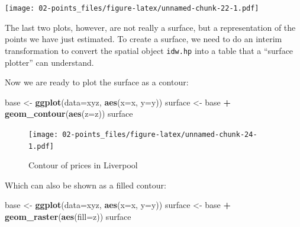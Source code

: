 \documentclass[]{book}
\newenvironment{Shaded}{\begin{snugshade}}{\end{snugshade}}
\newcommand{\KeywordTok}[1]{\textcolor[rgb]{0.13,0.29,0.53}{\textbf{#1}}}
\newcommand{\DataTypeTok}[1]{\textcolor[rgb]{0.13,0.29,0.53}{#1}}
\newcommand{\DecValTok}[1]{\textcolor[rgb]{0.00,0.00,0.81}{#1}}
\newcommand{\StringTok}[1]{\textcolor[rgb]{0.31,0.60,0.02}{#1}}
\newcommand{\OperatorTok}[1]{\textcolor[rgb]{0.81,0.36,0.00}{\textbf{#1}}}
\newcommand{\NormalTok}[1]{#1}
\begin{document}
\texttt{[image: 02-points\_files/figure-latex/unnamed-chunk-22-1.pdf]}

The last two plots, however, are not really a surface, but a
representation of the points we have just estimated. To create a
surface, we need to do an interim transformation to convert the spatial
object \texttt{idw.hp} into a table that a ``surface plotter'' can
understand.

\begin{Shaded}
\end{Shaded}

Now we are ready to plot the surface as a contour:

\begin{Shaded}
\begin{Highlighting}[]
\NormalTok{base <-}\StringTok{ }\KeywordTok{ggplot}\NormalTok{(}\DataTypeTok{data=}\NormalTok{xyz, }\KeywordTok{aes}\NormalTok{(}\DataTypeTok{x=}\NormalTok{x, }\DataTypeTok{y=}\NormalTok{y))}
\NormalTok{surface <-}\StringTok{ }\NormalTok{base }\OperatorTok{+}\StringTok{ }\KeywordTok{geom_contour}\NormalTok{(}\KeywordTok{aes}\NormalTok{(}\DataTypeTok{z=}\NormalTok{z))}
\NormalTok{surface}
\end{Highlighting}
\end{Shaded}

\begin{figure}
\centering
\texttt{[image: 02-points\_files/figure-latex/unnamed-chunk-24-1.pdf]}
\caption{\label{fig:unnamed-chunk-24}Contour of prices in Liverpool}
\end{figure}

Which can also be shown as a filled contour:

\begin{Shaded}
\begin{Highlighting}[]
\NormalTok{base <-}\StringTok{ }\KeywordTok{ggplot}\NormalTok{(}\DataTypeTok{data=}\NormalTok{xyz, }\KeywordTok{aes}\NormalTok{(}\DataTypeTok{x=}\NormalTok{x, }\DataTypeTok{y=}\NormalTok{y))}
\NormalTok{surface <-}\StringTok{ }\NormalTok{base }\OperatorTok{+}\StringTok{ }\KeywordTok{geom_raster}\NormalTok{(}\KeywordTok{aes}\NormalTok{(}\DataTypeTok{fill=}\NormalTok{z))}
\NormalTok{surface}
\end{Highlighting}
\end{Shaded}
\end{document}
